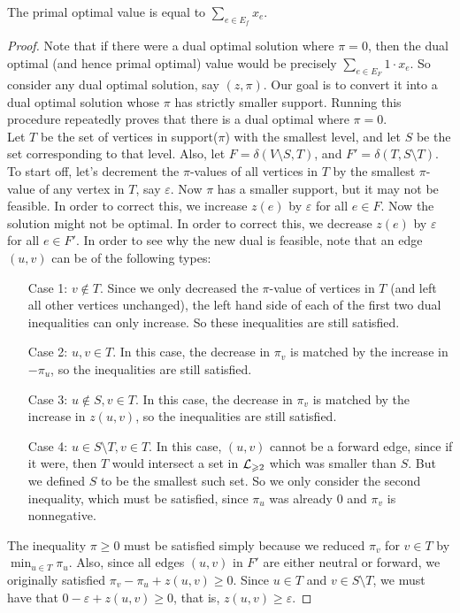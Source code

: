 \documentclass[./main.tex]{subfiles}
\begin{document}
	\vspace{2mm}
		\begin{claim}
			The primal optimal value is equal to $\sum_{e\in E_f}x_e$.
		\end{claim}
		\begin{proof}
			Note that if there were a dual optimal solution where $\pi = 0$, then the dual optimal (and hence primal optimal) value would be precisely $\sum_{e\in E_F}1\cdot x_e$. 
			So consider any dual optimal solution, say $(z,\pi)$. Our goal is to convert it into a dual optimal solution whose $\pi$ has strictly smaller support. 
			Running this procedure repeatedly proves that there is a dual optimal where $\pi = 0$.\\
			\vspace{2mm}
			Let $T$ be the set of vertices in support($\pi$) with the smallest level, and let $S$ be the set corresponding to that level.
			Also, let $F = \delta(V\setminus S, T)$, and $F' = \delta(T,S\setminus T)$.\\
			
			To start off, let's decrement the $\pi$-values of all vertices in $T$ by the smallest $\pi$-value of any vertex in $T$, say $\varepsilon$. Now $\pi$ has a smaller support, but it may not be feasible. In order to correct this, we increase $z(e)$ by $\varepsilon$ for all $e\in F$. Now the solution might not be optimal. In order to correct this, we decrease $z(e)$ by $\varepsilon$ for all $e\in F'$. In order to see why the new dual is feasible, note that an edge $(u,v)$ can be of the following types:
				\begin{itemize}
					\item[Case 1:] $v\notin T$. Since we only decreased the $\pi$-value of vertices in $T$ (and left all other vertices unchanged), the left hand side of each of the first two dual inequalities can only increase. So these inequalities are still satisfied.
					\item[Case 2:] $u,v\in T$. In this case, the decrease in $\pi_v$ is matched by the increase in $-\pi_u$, so the inequalities are still satisfied.
					\item[Case 3:] $u\notin S, v\in T$. In this case, the decrease in $\pi_v$ is matched by the increase in $z(u,v)$, so the inequalities are still satisfied.
					\item[Case 4:] $u\in S\setminus T, v\in T$. In this case, $(u,v)$ cannot be a forward edge, since if it were, then $T$ would intersect a set in $\mathcal{L}_{\geqslant 2}$ which was smaller than $S$. But we defined $S$ to be the smallest such set. So we only consider the second inequality, which must be satisfied, since $\pi_u$ was already $0$ and $\pi_v$ is nonnegative.
				\end{itemize}
			The inequality $\pi\geqslant 0$ must be satisfied simply because we reduced $\pi_v$ for $v\in T$ by $\min_{u\in T}\pi_u$. 
			Also, since all edges $(u,v)$ in $F'$ are either neutral or forward, we originally satisfied $\pi_v - \pi_u + z(u,v)\geqslant 0$. Since $u\in T$ and $v\in S\setminus T$, we must have that $0 - \varepsilon + z(u,v)\geqslant 0$, that is, $z(u,v)\geqslant \varepsilon$. 
			

\end{proof}
\end{document}

